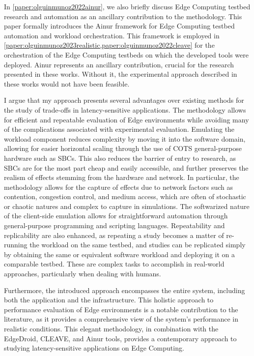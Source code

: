 In \cref{paper:olguinmunoz2022ainur}, we also briefly discuss Edge Computing testbed research and automation as an ancillary contribution to the methodology.
This paper formally introduces the Ainur framework for Edge Computing testbed automation and workload orchestration.
This framework is employed in \cref{paper:olguinmunoz2023realistic,paper:olguinmunoz2022cleave} for the orchestration of the Edge Computing testbeds on which the developed tools were deployed.
Ainur represents an ancillary contribution, crucial for the research presented in these works.
Without it, the experimental approach described in these works would not have been feasible.

I argue that my approach presents several advantages over existing methods for the study of trade-offs in latency-sensitive applications.
The methodology allows for efficient and repeatable evaluation of Edge environments while avoiding many of the complications associated with experimental evaluation.
Emulating the workload component reduces complexity by moving it into the software domain, allowing for easier horizontal scaling through the use of \gls{COTS} general-purpose hardware such as \glspl{SBC}.
This also reduces the barrier of entry to  research, as \glspl{SBC} are for the most part cheap and easily accessible, and further preserves the realism of effects stemming from the hardware and network.
In particular, the methodology allows for the capture of effects due to network factors such as contention, congestion control, and medium access, which are often of stochastic or chaotic natures and complex to capture in simulations.
The softwarized nature of the client-side emulation allows for straightforward automation through general-purpose programming and scripting languages.
Repeatability and replicability are also enhanced, as repeating a study becomes a matter of re-running the workload on the same testbed, and studies can be replicated simply by obtaining the same or equivalent software workload and deploying it on a comparable testbed.
These are complex tasks to accomplish in real-world approaches, particularly when dealing with humans.

Furthermore, the introduced approach encompasses the entire system, including both the application and the infrastructure. 
This holistic approach to performance evaluation of Edge environments is a notable contribution to the literature, as it provides a comprehensive view of the system's performance in realistic conditions.
This elegant methodology, in combination with the EdgeDroid, \gls{CLEAVE}, and Ainur tools, provides a contemporary approach to studying latency-sensitive applications on Edge Computing.

